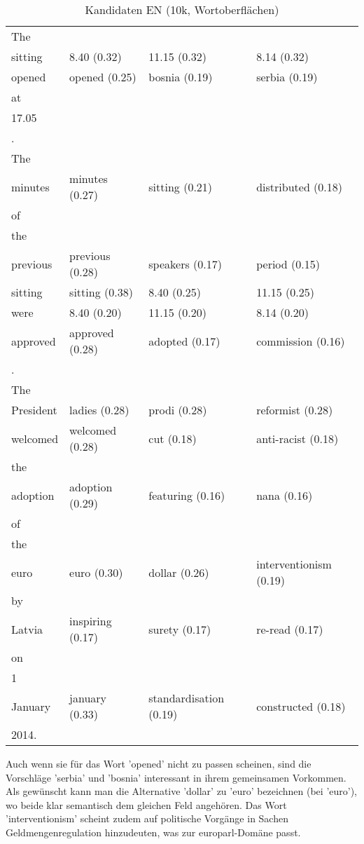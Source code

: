 \documentclass[11pt,twoside,openright]{mpreport}
\begin{document}
\begin{table}[H]
\hspace{-0cm}\begin{footnotesize}\begin{tabular}{|llll|}
\hline
The & & & \\
sitting                 & 8.40 (0.32) & 11.15 (0.32) & 8.14 (0.32) \\
opened                  & opened (0.25) & bosnia (0.19) & serbia (0.19) \\
at & & & \\
17.05 & & & \\
. & & & \\
The & & & \\
minutes                 & minutes (0.27) & sitting (0.21) & distributed (0.18) \\
of & & & \\
the & & & \\
previous                & previous (0.28) & speakers (0.17) & period (0.15) \\
sitting                 & sitting (0.38) & 8.40 (0.25) & 11.15 (0.25) \\
were                    & 8.40 (0.20) & 11.15 (0.20) & 8.14 (0.20) \\
approved                & approved (0.28) & adopted (0.17) & commission (0.16) \\
. & & & \\
The & & & \\
President               & ladies (0.28) & prodi (0.28) & reformist (0.28) \\
welcomed                & welcomed (0.28) & cut (0.18) & anti-racist (0.18) \\
the & & & \\
adoption                & adoption (0.29) & featuring (0.16) & nana (0.16) \\
of & & & \\
the & & & \\
euro                    & euro (0.30) & dollar (0.26) & interventionism (0.19) \\
by & & & \\
Latvia                  & inspiring (0.17) & surety (0.17) & re-read (0.17) \\
on & & & \\
1 & & & \\
January                 & january (0.33) & standardisation (0.19) & constructed (0.18) \\
2014. & & & \\
\hline
\end{tabular}\end{footnotesize}
\caption{Kandidaten EN (10k, Wortoberflächen)}
\end{table}
Auch wenn sie für das Wort 'opened' nicht zu passen scheinen, sind die Vorschläge 'serbia' und 'bosnia' interessant in ihrem gemeinsamen Vorkommen. Als gewünscht kann man die Alternative 'dollar' zu 'euro' bezeichnen (bei 'euro'), wo beide klar semantisch dem gleichen Feld angehören. Das Wort
'interventionism' scheint zudem auf politische Vorgänge in Sachen Geldmengenregulation hinzudeuten, was zur europarl-Domäne passt.
\end{document}
